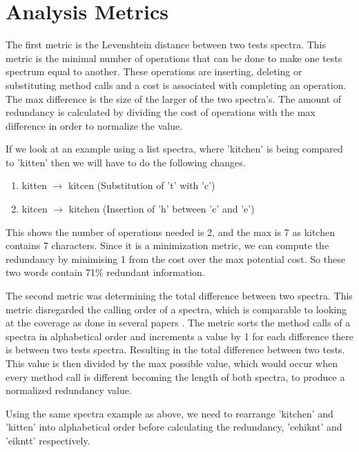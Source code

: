 \section{Analysis Metrics}
\label{S:metrics}

The first metric is the Levenshtein distance between two tests spectra. This metric is the minimal number of operations that can be done to make one tests spectrum equal to another. These operations are inserting, deleting or substituting method calls and a cost is associated with completing an operation. The max difference is the size of the larger of the two spectra's. The amount of redundancy is calculated by dividing the cost of operations with the max difference in order to normalize the value.

If we look at an example using a list spectra, where 'kitchen' is being compared to 'kitten' then we will have to do the following changes.

\begin{enumerate}
\item kitten $\rightarrow$ kitcen (Substitution of 't' with 'c')
\item kitcen $\rightarrow$ kitchen (Insertion of 'h' between 'c' and 'e')
\end{enumerate}

This shows the number of operations needed is 2, and the max is 7 as kitchen contains 7 characters. Since it is a minimization metric, we can compute the redundancy by minimising 1 from the cost over the max potential cost. So these two words contain 71\% redundant information. 

The second metric was determining the total difference between two spectra. This metric disregarded the calling order of a spectra, which is comparable to looking at the coverage as done in several papers \cite{fraser2007redundancy,koochakzadeh2009test,zhang2011empirical,jeffrey2005test}. The metric sorts the method calls of a spectra in alphabetical order and increments a value by 1 for each difference there is between two tests spectra. Resulting in the total difference between two tests. This value is then divided by the max possible value, which would occur when every method call is different becoming the length of both spectra, to produce a normalized redundancy value.

Using the same spectra example as above, we need to rearrange 'kitchen' and 'kitten' into alphabetical order before calculating the redundancy, 'cehiknt' and 'eikntt' respectively.

